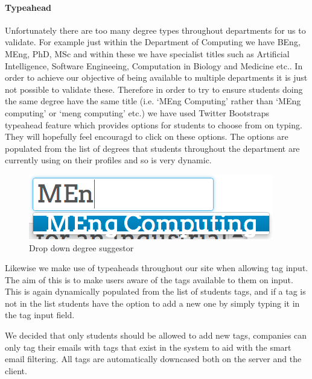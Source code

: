     \paragraph{Typeahead} Unfortunately there are too many degree types throughout departments for us to validate. For example just within the Department of Computing we have BEng, MEng, PhD, MSc and within these we have specialist titles such as Artificial Intelligence, Software Engineeing, Computation in Biology and Medicine etc.\cite{doc-ug-degrees}. In order to achieve our objective of being available to multiple departments it is just not possible to validate these. Therefore in order to try to ensure students doing the same degree have the same title (i.e. `MEng Computing' rather than `MEng computing' or `meng computing' etc.) we have used Twitter Bootstraps typeahead feature which provides options for students to choose from on typing. They will hopefully feel encouragd to click on these options. The options are populated from the list of degrees that students throughout the department are currently using on their profiles and so is very dynamic.

    \begin{figure}[H]\centering
    \includegraphics[scale=0.5]{images/design/edit_suggestions}
    \caption{Drop down degree suggestor}
    \end{figure}

    Likewise we make use of typeaheads throughout our site when allowing tag input. The aim of this is to make users aware of the tags available to them on input. This is again dynamically populated from the list of students tags, and if a tag is not in the list students have the option to add a new one by simply typing it in the tag input field. 

    We decided that only students should be allowed to add new tags, companies can only tag their emails with tags that exist in the system to aid with the smart email filtering.
    All tags are automatically downcased both on the server and the client.

